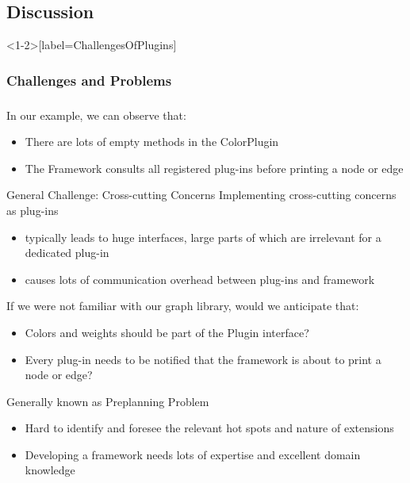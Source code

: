 \subsection{Discussion}
\begin{frame}<1-2>[label=ChallengesOfPlugins]
	\frametitle<1-2>{Challenges and Problems}
	\frametitle<3>{\myframetitle}
	\begin{fancycolumns}
		\begin{example}{}
			In our example, we can observe that:
			\begin{itemize}
				\item There are lots of empty methods in the ColorPlugin 
				\item The Framework consults all registered plug-ins before printing a node or edge
			\end{itemize}
		\end{example}		
		\begin{definition}{General Challenge: Cross-cutting Concerns}
			Implementing cross-cutting concerns as plug-ins 
			\begin{itemize}				
				\item typically leads to huge interfaces, large parts of which are irrelevant for a dedicated plug-in 
				\item causes lots of communication overhead between plug-ins and framework
			\end{itemize}
		\end{definition}
	\nextcolumn
		\begin{example}{}
			If we were not familiar with our graph library, would we anticipate that:
			\begin{itemize}
				\item Colors and weights should be part of the Plugin interface?
				\item Every plug-in needs to be notified that the framework is about to print a node or edge? 
			\end{itemize}
		\end{example}
		\begin{definition}{Generally known as Preplanning Problem}
			\begin{itemize}
				\item Hard to identify and foresee the relevant hot spots and nature of extensions
				\item Developing a framework needs lots of expertise and excellent domain knowledge 
			\end{itemize}
		\end{definition}
	\end{fancycolumns}
\end{frame}
